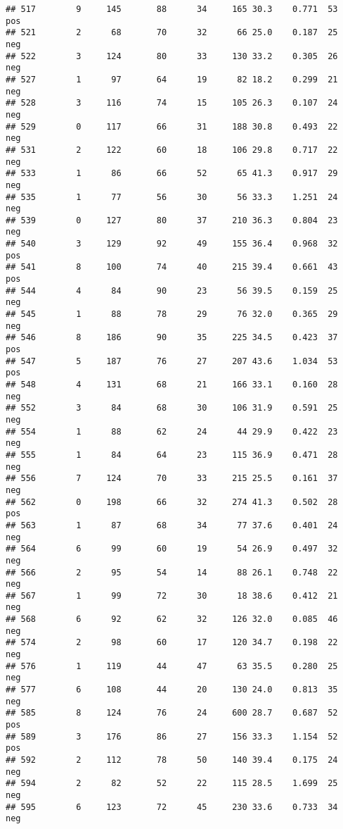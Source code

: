 \documentclass[
]{article}
\begin{document}
\begin{verbatim}
## 517        9     145       88      34     165 30.3    0.771  53      pos
## 521        2      68       70      32      66 25.0    0.187  25      neg
## 522        3     124       80      33     130 33.2    0.305  26      neg
## 527        1      97       64      19      82 18.2    0.299  21      neg
## 528        3     116       74      15     105 26.3    0.107  24      neg
## 529        0     117       66      31     188 30.8    0.493  22      neg
## 531        2     122       60      18     106 29.8    0.717  22      neg
## 533        1      86       66      52      65 41.3    0.917  29      neg
## 535        1      77       56      30      56 33.3    1.251  24      neg
## 539        0     127       80      37     210 36.3    0.804  23      neg
## 540        3     129       92      49     155 36.4    0.968  32      pos
## 541        8     100       74      40     215 39.4    0.661  43      pos
## 544        4      84       90      23      56 39.5    0.159  25      neg
## 545        1      88       78      29      76 32.0    0.365  29      neg
## 546        8     186       90      35     225 34.5    0.423  37      pos
## 547        5     187       76      27     207 43.6    1.034  53      pos
## 548        4     131       68      21     166 33.1    0.160  28      neg
## 552        3      84       68      30     106 31.9    0.591  25      neg
## 554        1      88       62      24      44 29.9    0.422  23      neg
## 555        1      84       64      23     115 36.9    0.471  28      neg
## 556        7     124       70      33     215 25.5    0.161  37      neg
## 562        0     198       66      32     274 41.3    0.502  28      pos
## 563        1      87       68      34      77 37.6    0.401  24      neg
## 564        6      99       60      19      54 26.9    0.497  32      neg
## 566        2      95       54      14      88 26.1    0.748  22      neg
## 567        1      99       72      30      18 38.6    0.412  21      neg
## 568        6      92       62      32     126 32.0    0.085  46      neg
## 574        2      98       60      17     120 34.7    0.198  22      neg
## 576        1     119       44      47      63 35.5    0.280  25      neg
## 577        6     108       44      20     130 24.0    0.813  35      neg
## 585        8     124       76      24     600 28.7    0.687  52      pos
## 589        3     176       86      27     156 33.3    1.154  52      pos
## 592        2     112       78      50     140 39.4    0.175  24      neg
## 594        2      82       52      22     115 28.5    1.699  25      neg
## 595        6     123       72      45     230 33.6    0.733  34      neg

\end{verbatim}
\end{document}
